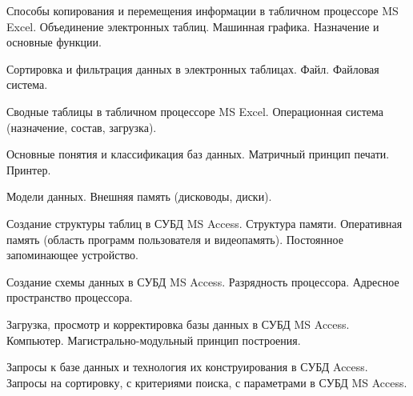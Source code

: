 \documentclass[
	14pt,
	a4paper,
	]
	{scrartcl}
\begin{document}
\shapk
{}
\setcounter{zad}{0}

\vfill
\z Способы копирования и перемещения информации в табличном процессоре MS Excel. Объединение электронных таблиц.
 \vfill
\z Машинная графика. Назначение и основные функции. 
 \vfill

\vfill

\newpage


\shapk
{}
\setcounter{zad}{0}

\vfill
\z Сортировка и фильтрация данных в электронных таблицах.
 \vfill
\z Файл. Файловая система. 
 \vfill

\vfill

\newpage


\shapk
{}
\setcounter{zad}{0}

\vfill
\z Сводные таблицы в табличном процессоре MS Excel.
 \vfill
\z Операционная система (назначение, состав, загрузка). 
 \vfill

\vfill

\newpage


\shapk
{}
\setcounter{zad}{0}

\vfill
\z Основные понятия и классификация баз данных.
 \vfill
\z Матричный принцип печати. Принтер. 
 \vfill

\vfill

\newpage


\shapk
{}
\setcounter{zad}{0}

\vfill
\z Модели данных.
 \vfill
\z Внешняя память (дисководы, диски). 
 \vfill

\vfill

\newpage


\shapk
{}
\setcounter{zad}{0}

\vfill
\z Создание структуры таблиц в СУБД MS Access.
 \vfill
\z Структура памяти. Оперативная память (область программ пользователя и видеопамять). Постоянное запоминающее устройство. 
 \vfill

\vfill

\newpage


\shapk
{}
\setcounter{zad}{0}

\vfill
\z Создание схемы данных в СУБД MS Access.
 \vfill
\z Разрядность процессора. Адресное пространство процессора. 
 \vfill

\vfill

\newpage


\shapk
{}
\setcounter{zad}{0}

\vfill
\z Загрузка, просмотр и корректировка базы данных в СУБД MS Access.
 \vfill
\z Компьютер. Магистрально-модульный принцип построения. 
 \vfill

\vfill

\newpage


\shapk
{}
\setcounter{zad}{0}

\vfill
\z Запросы к базе данных и технология их конструирования в СУБД Access.
 \vfill
\z Запросы на сортировку, с критериями поиска, с параметрами в СУБД MS Access.
 \vfill

\vfill

\newpage
\end{document}
